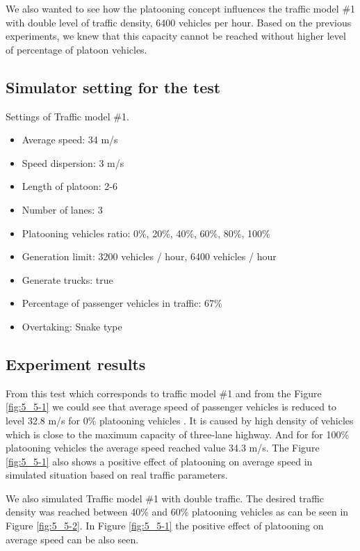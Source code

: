 We also wanted to see how the platooning concept influences the traffic model \#1 with double level of traffic density, 6400 vehicles per hour. Based on the previous experiments, we knew that this capacity cannot be reached without higher level of percentage of platoon vehicles.



\subsection*{Simulator setting for the test}

Settings of Traffic model \#1.
\begin{itemize}
\item Average speed: 34 m/s
\item Speed dispersion: 3 m/s
\item Length of platoon: 2-6
\item Number of lanes:  3
\item Platooning vehicles ratio: 0\%, 20\%, 40\%, 60\%, 80\%, 100\%
\item Generation limit: 3200 vehicles / hour, 6400 vehicles / hour
\item Generate trucks: true
\item Percentage of passenger vehicles in traffic: 67\%
\item Overtaking: Snake type
\end{itemize}




\subsection*{Experiment results}

From this test which corresponds to traffic model \#1 and from the Figure \ref{fig:5_5-1} we could see that average speed of passenger vehicles is reduced to level 32.8 m/s for 0\% platooning vehicles . It is caused by high density of vehicles which is close to the maximum capacity of three-lane highway. And for for 100\% platooning vehicles the average speed reached value  34.3 m/s. The Figure \ref{fig:5_5-1} also shows a positive effect of platooning on average speed in simulated situation based on real traffic parameters.

We also simulated Traffic model \#1 with double traffic. The desired traffic density was reached between 40\% and 60\% platooning vehicles as can be seen in Figure \ref{fig:5_5-2}. In Figure \ref{fig:5_5-1} the positive effect of platooning on average speed can be also seen.




